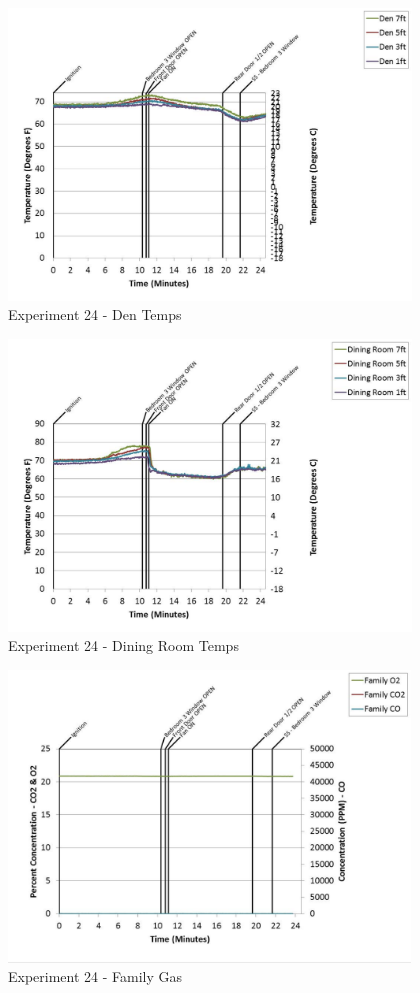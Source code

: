\documentclass{article}
\begin{document}
\begin{appendices}
	\clearpage

	\begin{figure}[h!]
		\centering
		\includegraphics[height=3.05in]{0_Images/Results_Charts/Exp_24_Charts/DenTemps.pdf}
		\caption{Experiment 24 - Den Temps}
	\end{figure}
 

	\begin{figure}[h!]
		\centering
		\includegraphics[height=3.05in]{0_Images/Results_Charts/Exp_24_Charts/DiningRoomTemps.pdf}
		\caption{Experiment 24 - Dining Room Temps}
	\end{figure}
 
	\clearpage

	\begin{figure}[h!]
		\centering
		\includegraphics[height=3.05in]{0_Images/Results_Charts/Exp_24_Charts/FamilyGas.pdf}
		\caption{Experiment 24 - Family Gas}
	\end{figure}
 


\end{appendices}
\end{document}

